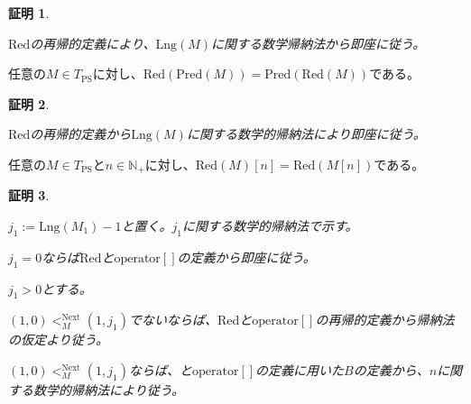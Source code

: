 \documentclass[dvipdfmx,uplatex]{jsarticle}
\theoremstyle{customnonumberbreakfortheorem}
\theoremstyle{customnonumberbreakforproof}
\newtheorem{hideableproof}{証明}
\begin{document}
\begin{hideableproof}
	\begin{indented}
		\item \(\textrm{Red}\)の再帰的定義により、\(\textrm{Lng}(M)\)に関する数学帰納法から即座に従う。
	\end{indented}
\end{hideableproof}

\begin{proposition}\label{RedとPredの可換性}
	任意の\(M \in T_{\textrm{PS}}\)に対し、\(\textrm{Red}(\textrm{Pred}(M)) = \textrm{Pred}(\textrm{Red}(M))\)である。
\end{proposition}

\begin{hideableproof}
	\begin{indented}
		\item \(\textrm{Red}\)の再帰的定義から\(\textrm{Lng}(M)\)に関する数学的帰納法により即座に従う。
	\end{indented}
\end{hideableproof}

\begin{proposition}\label{Redと基本列の可換性}
	任意の\(M \in T_{\textrm{PS}}\)と\(n \in \mathbb{N}_{+}\)に対し、\(\textrm{Red}(M)[n] = \textrm{Red}(M[n])\)である。
\end{proposition}

\begin{hideableproof}
	\begin{indented}
		\item \(j_1 := \textrm{Lng}(M_1)-1\)と置く。\(j_1\)に関する数学的帰納法で示す。
		\item \(j_1 = 0\)ならば\(\textrm{Red}\)と\(\textrm{operator}[]\)の定義から即座に従う。
		\item \(j_1 > 0\)とする。
		\begin{indented}
			\item \((1,0) <_M^{\textrm{Next}} (1,j_1)\)でないならば、\(\textrm{Red}\)と\(\textrm{operator}[]\)の再帰的定義から帰納法の仮定より従う。
			\item \((1,0) <_M^{\textrm{Next}} (1,j_1)\)ならば、と\(\textrm{operator}[]\)の定義に用いた\(B\)の定義から、\(n\)に関する数学的帰納法により従う。
		\end{indented}
	\end{indented}
\end{hideableproof}
\end{document}
